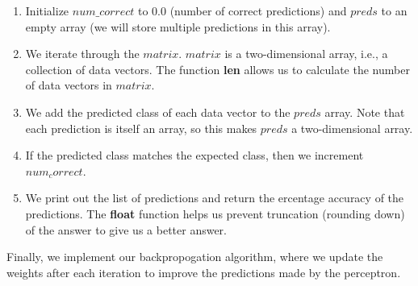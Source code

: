 	\begin{enumerate}
		\item Initialize $num\_correct$ to $0.0$ (number of correct predictions) and $preds$ to an empty array (we will store multiple predictions in this array). 
		
		\item We iterate through the $matrix$. $matrix$ is a two-dimensional array, i.e., a collection of data vectors. The function \textbf{len} allows us to calculate the number of data vectors in $matrix$. 
		
		\item We add the predicted class of each data vector to the $preds$ array. Note that each prediction is itself an array, so this makes $preds$ a two-dimensional array.
		
		\item If the predicted class matches the expected class, then we increment $num_correct$. 
		
		\item We print out the list of predictions and return the ercentage accuracy of the predictions. The \textbf{float} function helps us prevent truncation (rounding down) of the answer to give us a better answer.
	\end{enumerate}
	
	Finally, we implement our backpropogation algorithm, where we update the weights after each iteration to improve the predictions made by the perceptron.

